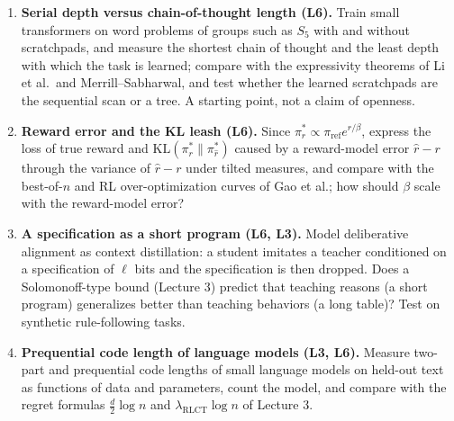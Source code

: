 \begin{enumerate}
\item \textbf{Serial depth versus chain-of-thought length (L6).} Train small transformers on word problems of groups such as $S_5$ with and without scratchpads, and measure the shortest chain of thought and the least depth with which the task is learned; compare with the expressivity theorems of Li et al.\ and Merrill--Sabharwal, and test whether the learned scratchpads are the sequential scan or a tree. A starting point, not a claim of openness.
\item \textbf{Reward error and the KL leash (L6).} Since $\pi^*_{r}\propto\pi_{\mathrm{ref}}e^{r/\beta}$, express the loss of true reward and $\mathrm{KL}(\pi^*_r\|\pi^*_{\hat r})$ caused by a reward-model error $\hat r-r$ through the variance of $\hat r-r$ under tilted measures, and compare with the best-of-$n$ and RL over-optimization curves of Gao et al.; how should $\beta$ scale with the reward-model error?
\item \textbf{A specification as a short program (L6, L3).} Model deliberative alignment as context distillation: a student imitates a teacher conditioned on a specification of $\ell$ bits and the specification is then dropped. Does a Solomonoff-type bound (Lecture 3) predict that teaching reasons (a short program) generalizes better than teaching behaviors (a long table)? Test on synthetic rule-following tasks.
\item \textbf{Prequential code length of language models (L3, L6).} Measure two-part and prequential code lengths of small language models on held-out text as functions of data and parameters, count the model, and compare with the regret formulas $\tfrac d2\log n$ and $\lambda_{\mathrm{RLCT}}\log n$ of Lecture 3.


\end{enumerate}
